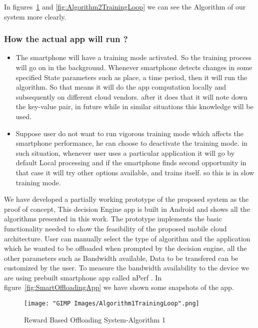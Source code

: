 \documentclass[12pt]{report}
\begin{document}
In figures~\ref{fig:Algorithm1TrainingLoop} and \ref{fig:Algorithm2TrainingLoop} we can see the Algorithm of our system more clearly.

\subsubsection{ How the actual app will run ?}
\begin{itemize}
\item The smartphone will have a training mode activated. So the training 
process will go on in the background. Whenever smartphone detects changes in 
some specified State parameters such as place, a time period, then it will run 
the algorithm. So that means it will do the app computation locally and subsequently 
on different cloud vendors. after it does that it will note down the key-value
pair, in future while in similar situations this knowledge will be used.

\item Suppose user do not want to run vigorous training mode which
affects the smartphone performance, he can choose to deactivate the training
mode. in such situation, whenever user uses a particular application it will 
go by default Local processing and if the smartphone finds second opportunity in that case it will try 
other options available, and trains itself. so this is in slow training mode.
\end{itemize}

We have developed a partially working prototype of the proposed system as the proof of concept, This decision Engine app is built in Android and shows all the algorithms presented in this work. The prototype implements the basic functionality needed to show the feasibility of the proposed mobile cloud architecture. User can manually select the type of algorithm and the application which he wanted to be offloaded when prompted by the decision engine, all the other parameters such as Bandwidth available, Data to be transfered can be customized by the user. To measure the bandwidth availability to the device we are using prebuilt smartphone app called nPerf \cite{nPerf}. 
In figure~\ref{fig:SmartOffloadingApp} we have shown some snapshots of the app.

\begin{figure}[h]
  \centering
  \texttt{[image: "GIMP Images/Algorithm1TrainingLoop".png]}
  \caption{Reward Based Offloading System-Algorithm 1}
  \label{fig:Algorithm1TrainingLoop}
\end{figure}
\end{document}
